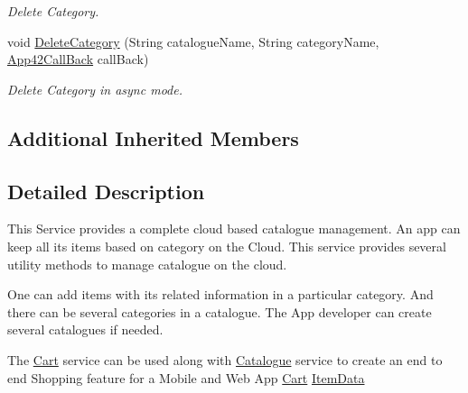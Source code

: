 \begin{DoxyCompactItemize}
\begin{DoxyCompactList}\small\item\em Delete Category. \end{DoxyCompactList}\item 
void \hyperlink{classcom_1_1shephertz_1_1app42_1_1paas_1_1sdk_1_1csharp_1_1shopping_1_1_catalogue_service_ab2ec9f1f9df25e8b2360410590852aea}{Delete\+Category} (String catalogue\+Name, String category\+Name, \hyperlink{interfacecom_1_1shephertz_1_1app42_1_1paas_1_1sdk_1_1csharp_1_1_app42_call_back}{App42\+Call\+Back} call\+Back)
\begin{DoxyCompactList}\small\item\em Delete Category in async mode. \end{DoxyCompactList}\end{DoxyCompactItemize}
\subsection*{Additional Inherited Members}


\subsection{Detailed Description}
This Service provides a complete cloud based catalogue management. An app can keep all its items based on category on the Cloud. This service provides several utility methods to manage catalogue on the cloud. 

One can add items with its related information in a particular category. And there can be several categories in a catalogue. The App developer can create several catalogues if needed.

The \hyperlink{classcom_1_1shephertz_1_1app42_1_1paas_1_1sdk_1_1csharp_1_1shopping_1_1_cart}{Cart} service can be used along with \hyperlink{classcom_1_1shephertz_1_1app42_1_1paas_1_1sdk_1_1csharp_1_1shopping_1_1_catalogue}{Catalogue} service to create an end to end Shopping feature for a Mobile and Web App \hyperlink{classcom_1_1shephertz_1_1app42_1_1paas_1_1sdk_1_1csharp_1_1shopping_1_1_cart_service}{Cart} \hyperlink{classcom_1_1shephertz_1_1app42_1_1paas_1_1sdk_1_1csharp_1_1shopping_1_1_cart_service}{Item\+Data} 

